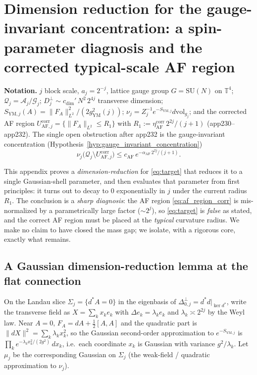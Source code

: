 \section{Dimension reduction for the gauge-invariant concentration: a
spin-parameter diagnosis and the corrected typical-scale AF region}
\label{app:typical_radius_gaussian_shell}

\noindent\textbf{Notation.}
$j$ block scale, $a_j=2^{-j}$, lattice gauge group $G=\mathrm{SU}(N)$ on
$\mathbb{T}^4$; $\mathcal{Q}_j=\mathcal{A}_j/\mathcal{G}_j$;
$D_j^\perp\sim c_{\dim}'\,N^2\,2^{4j}$ transverse dimension;
$S_{\mathrm{YM},j}(A)=\|F_A\|_{L^2}^2/(2g_{\mathrm{YM}}^2(j))$;
$\nu_j=Z_j^{-1}e^{-S_{\mathrm{YM},j}}d\mathrm{vol}_{g_j}$; and the
corrected AF region
$U_{\mathrm{AF},j}^{\mathrm{corr}}=\{\|F_A\|_{L^2}\le R_1\}$ with
$R_1:=\eta_{\mathrm{AF}}^{\mathrm{corr}}\,2^{2j}/(j+1)$
(app230--app232). The single open obstruction after app232 is the
gauge-invariant concentration
(Hypothesis~\ref{hyp:gauge_invariant_concentration})
\begin{equation}
\label{eq:target}
  \nu_j\bigl(\mathcal{Q}_j\setminus U_{\mathrm{AF},j}^{\mathrm{corr}}\bigr)
  \le c_{\mathrm{AF}}\,e^{-\alpha_{\mathrm{AF}}\,2^{2j}/(j+1)}.
\end{equation}

This appendix proves a \emph{dimension-reduction} for
\eqref{eq:target} that reduces it to a single Gaussian-shell parameter,
and then evaluates that parameter from first principles: it turns out to
decay to $0$ exponentially in $j$ under the current radius $R_1$. The
conclusion is a \emph{sharp diagnosis}: the AF region
\eqref{eq:af_region_corr} is mis-normalized by a parametrically large
factor ($\sim 2^j$), so \eqref{eq:target} is \emph{false} as stated, and
the correct AF region must be placed at the \emph{typical} curvature
radius. We make no claim to have closed the mass gap; we isolate, with a
rigorous core, exactly what remains.

\subsection{A Gaussian dimension-reduction lemma at the flat connection}

On the Landau slice $\Sigma_j=\{d^*A=0\}$ in the eigenbasis of
$\Delta_{0,j}^\perp=d^*d|_{\ker d^*}$, write the transverse field as
$X=\sum_k x_k e_k$ with $\Delta e_k=\lambda_k e_k$ and
$\lambda_k\asymp 2^{2j}$ by the Weyl law. Near $A=0$,
$F_A=dA+\tfrac12[A,A]$ and the quadratic part is
$\|dX\|^2=\sum_k\lambda_k x_k^2$, so the Gaussian second-order
approximation to $e^{-S_{\mathrm{YM},j}}$ is
$\prod_k e^{-\lambda_k x_k^2/(2g^2)}\,dx_k$, i.e.\ each coordinate $x_k$
is Gaussian with variance $g^2/\lambda_k$. Let $\mu_j$ be the
corresponding Gaussian on $\Sigma_j$ (the weak-field / quadratic
approximation to $\nu_j$).

